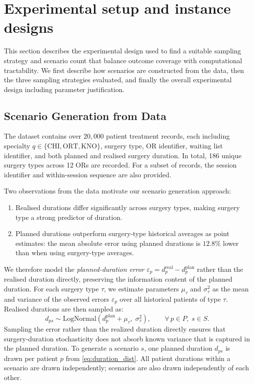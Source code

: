 \section{Experimental setup and instance designs}
\label{sec:saa}

This section describes the experimental design used to find a suitable sampling
strategy and scenario count that balance outcome coverage with computational
tractability. We first describe how scenarios are constructed from the data,
then the three sampling strategies evaluated, and finally the overall
experimental design including parameter justification.

\subsection{Scenario Generation from Data}
\label{sec:scenario_data}

The dataset contains over $20{,}000$ patient treatment records, each including
specialty $q \in \{\text{CHI},\text{ORT},\text{KNO}\}$, surgery type, OR
identifier, waiting list identifier, and both planned and realised surgery
duration. In total, 186 unique surgery types across 12 ORs are recorded. For a
subset of records, the session identifier and within-session sequence are also
provided.

Two observations from the data motivate our scenario generation approach:
\begin{enumerate}
  \item Realised durations differ significantly across surgery types, making
        surgery type a strong predictor of duration.
  \item Planned durations outperform surgery-type historical averages as point
        estimates: the mean absolute error using planned durations is $12.8\%$
        lower than when using surgery-type averages.
\end{enumerate}

We therefore model the \emph{planned-duration error}
$\varepsilon_p = d_p^{\text{real}} - d_p^{\text{plan}}$ rather than the
realised duration directly, preserving the information content of the planned
duration. For each surgery type $\tau$, we estimate parameters
$\mu_\tau$ and $\sigma_\tau^2$ as the mean and variance of the observed errors
$\varepsilon_p$ over all historical patients of type $\tau$. Realised durations
are then sampled as:
%
\begin{equation}
  d_{ps} \sim
    \mathrm{LogNormal}\!\left(d_p^{\text{plan}} + \mu_\tau,\; \sigma_\tau^2
    \right),
  \qquad \forall\, p \in P,\; s \in S.
  \label{eq:duration_dist}
\end{equation}
%
Sampling the error rather than the realized duration directly ensures that surgery-duration stochasticity
does not absorb known variance that is captured in the planned
duration. To generate a scenario $s$, one planned duration $d_{ps}$ is drawn per
patient $p$ from \eqref{eq:duration_dist}. All patient durations within a
scenario are drawn independently; scenarios are also drawn independently of
each other.

